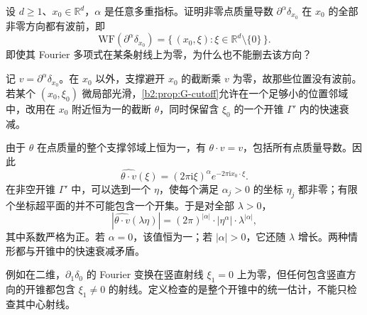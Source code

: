 \begin{exercise}\label{b2:ex:app-G-4}
设 \(d\ge1\)、\(x_0\in\mathbb R^d\)，\(\alpha\) 是任意多重指标。证明非零点质量导数 \(\partial^\alpha\delta_{x_0}\) 在 \(x_0\) 的全部非零方向都有波前，即
\[
 \mathrm{WF}(\partial^\alpha\delta_{x_0})
 =\{\,(x_0,\xi):\xi\in\mathbb R^d\setminus\{0\}\,\}.
\]
即使其 Fourier 多项式在某条射线上为零，为什么也不能删去该方向？
\end{exercise}
\begin{solution}
记 \(v=\partial^\alpha\delta_{x_0}\)。在 \(x_0\) 以外，支撑避开 \(x_0\) 的截断乘 \(v\) 为零，故那些位置没有波前。若某个 \((x_0,\xi_0)\) 微局部光滑，\cref{b2:prop:G-cutoff}允许在一个足够小的位置邻域中，改用在 \(x_0\) 附近恒为一的截断 \(\theta\)，同时保留含 \(\xi_0\) 的一个开锥 \(\Gamma'\) 内的快速衰减。

由于 \(\theta\) 在点质量的整个支撑邻域上恒为一，有 \(\theta\cdot v=v\)，包括所有点质量导数。因此
\[
 \widehat{\theta\cdot v}(\xi)
 =(2\pi\mathrm i\xi)^\alpha e^{-2\pi\mathrm ix_0\cdot\xi}.
\]
在非空开锥 \(\Gamma'\) 中，可以选到一个 \(\eta\)，使每个满足 \(\alpha_j>0\) 的坐标 \(\eta_j\) 都非零；有限个坐标超平面的并不可能包含一个开集。于是对全部 \(\lambda>0\)，
\[
 |\widehat{\theta\cdot v}(\lambda\eta)|
 =(2\pi)^{|\alpha|}\cdot|\eta^\alpha|\cdot\lambda^{|\alpha|},
\]
其中系数严格为正。若 \(\alpha=0\)，该值恒为一；若 \(|\alpha|>0\)，它还随 \(\lambda\) 增长。两种情形都与开锥中的快速衰减矛盾。

例如在二维，\(\partial_1\delta_0\) 的 Fourier 变换在竖直射线 \(\xi_1=0\) 上为零，但任何包含竖直方向的开锥都包含 \(\xi_1\ne0\) 的射线。定义检查的是整个开锥中的统一估计，不能只检查其中心射线。
\end{solution}

